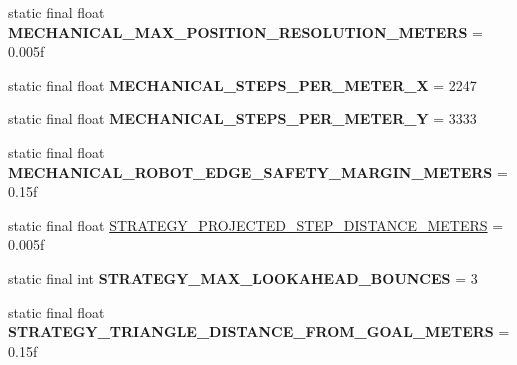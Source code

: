 \begin{DoxyCompactItemize}
\item 
\hypertarget{classairhockeyjava_1_1game_1_1_constants_a3366c2a889a55c4a626d810f15ff3742}{}static final float {\bfseries M\+E\+C\+H\+A\+N\+I\+C\+A\+L\+\_\+\+M\+A\+X\+\_\+\+P\+O\+S\+I\+T\+I\+O\+N\+\_\+\+R\+E\+S\+O\+L\+U\+T\+I\+O\+N\+\_\+\+M\+E\+T\+E\+R\+S} = 0.\+005f\label{classairhockeyjava_1_1game_1_1_constants_a3366c2a889a55c4a626d810f15ff3742}

\item 
\hypertarget{classairhockeyjava_1_1game_1_1_constants_ad78053b4d3c3ea6d2c9d475160fbc0fc}{}static final float {\bfseries M\+E\+C\+H\+A\+N\+I\+C\+A\+L\+\_\+\+S\+T\+E\+P\+S\+\_\+\+P\+E\+R\+\_\+\+M\+E\+T\+E\+R\+\_\+\+X} = 2247\label{classairhockeyjava_1_1game_1_1_constants_ad78053b4d3c3ea6d2c9d475160fbc0fc}

\item 
\hypertarget{classairhockeyjava_1_1game_1_1_constants_ac7d822697d848aee3fd40a2b03140921}{}static final float {\bfseries M\+E\+C\+H\+A\+N\+I\+C\+A\+L\+\_\+\+S\+T\+E\+P\+S\+\_\+\+P\+E\+R\+\_\+\+M\+E\+T\+E\+R\+\_\+\+Y} = 3333\label{classairhockeyjava_1_1game_1_1_constants_ac7d822697d848aee3fd40a2b03140921}

\item 
\hypertarget{classairhockeyjava_1_1game_1_1_constants_aa1bddc203b1c6ce068619043e9f00089}{}static final float {\bfseries M\+E\+C\+H\+A\+N\+I\+C\+A\+L\+\_\+\+R\+O\+B\+O\+T\+\_\+\+E\+D\+G\+E\+\_\+\+S\+A\+F\+E\+T\+Y\+\_\+\+M\+A\+R\+G\+I\+N\+\_\+\+M\+E\+T\+E\+R\+S} = 0.\+15f\label{classairhockeyjava_1_1game_1_1_constants_aa1bddc203b1c6ce068619043e9f00089}

\item 
static final float \hyperlink{classairhockeyjava_1_1game_1_1_constants_a157340a611bfafdfaa28377b19d4146f}{S\+T\+R\+A\+T\+E\+G\+Y\+\_\+\+P\+R\+O\+J\+E\+C\+T\+E\+D\+\_\+\+S\+T\+E\+P\+\_\+\+D\+I\+S\+T\+A\+N\+C\+E\+\_\+\+M\+E\+T\+E\+R\+S} = 0.\+005f
\item 
\hypertarget{classairhockeyjava_1_1game_1_1_constants_a7327018189d44bb7cc0fa79d96c2ff14}{}static final int {\bfseries S\+T\+R\+A\+T\+E\+G\+Y\+\_\+\+M\+A\+X\+\_\+\+L\+O\+O\+K\+A\+H\+E\+A\+D\+\_\+\+B\+O\+U\+N\+C\+E\+S} = 3\label{classairhockeyjava_1_1game_1_1_constants_a7327018189d44bb7cc0fa79d96c2ff14}

\item 
\hypertarget{classairhockeyjava_1_1game_1_1_constants_aa1542a690da5e09364b8b5e549b33bc0}{}static final float {\bfseries S\+T\+R\+A\+T\+E\+G\+Y\+\_\+\+T\+R\+I\+A\+N\+G\+L\+E\+\_\+\+D\+I\+S\+T\+A\+N\+C\+E\+\_\+\+F\+R\+O\+M\+\_\+\+G\+O\+A\+L\+\_\+\+M\+E\+T\+E\+R\+S} = 0.\+15f\label{classairhockeyjava_1_1game_1_1_constants_aa1542a690da5e09364b8b5e549b33bc0}


\end{DoxyCompactItemize}
